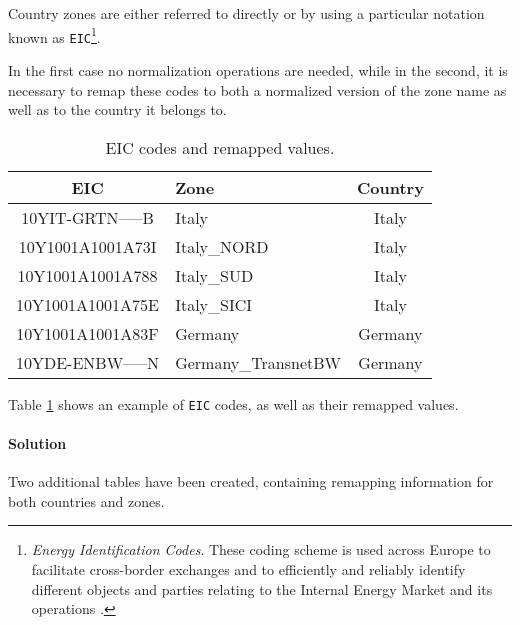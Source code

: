         Country zones are either referred to directly or by using a particular notation known as \texttt{EIC}\footnote{
            \textit{Energy Identification Codes}.
            These coding scheme is used across Europe to facilitate cross-border exchanges and to efficiently and reliably identify different objects and parties relating to the Internal Energy Market and its operations \cite{bib:enstoe:eic}.
        }.
        
        In the first case no normalization operations are needed, while in the second, it is necessary to remap these codes to both a normalized version of the zone name as well as to the country it belongs to.
        
        \begin{table}
            \centering
            \begin{tabular}{|c|l c|}
                \toprule
                EIC                 & Zone                  & Country   \\
                \midrule
                10YIT-GRTN-----B	& Italy	                & Italy     \\
                10Y1001A1001A73I	& Italy\_NORD           & Italy     \\
                10Y1001A1001A788	& Italy\_SUD            & Italy     \\
                10Y1001A1001A75E	& Italy\_SICI	        & Italy     \\
                10Y1001A1001A83F	& Germany               & Germany   \\
                10YDE-ENBW-----N	& Germany\_TransnetBW   & Germany   \\
                \bottomrule
            \end{tabular}
            \caption{EIC codes and remapped values.}
            \label{tab:dwh:remapping:country_zone}
        \end{table}
        
        Table \ref{tab:dwh:remapping:country_zone} shows an example of \texttt{EIC} codes, as well as their remapped values.
        
\paragraph{Solution}
    Two additional tables have been created, containing remapping information for both countries and zones.
    
